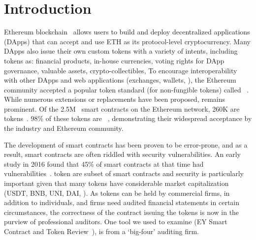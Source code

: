 
\section{Introduction}\label{sect:introduction}
Ethereum blockchain~\cite{EthGit,EIP150} allows users to build and deploy decentralized applications (DApps) that can accept and use ETH as its protocol-level cryptocurrency. Many DApps also issue their own custom tokens with a variety of intents, including tokens as: financial products, in-house currencies, voting rights for DApp governance, valuable assets, crypto-collectibles, \etc To encourage interoperability with other DApps and web applications (exchanges, wallets, \etc), the Ethereum community accepted a popular token standard (for non-fungible tokens) called \erc~\cite{ERC20Std}. While numerous \erc extensions or replacements have been proposed, \erc remains prominent. Of the 2.5M~\cite{Alethio} smart contracts on the Ethereum network, 260K are tokens~\cite{TokenTracker}. 98\% of these tokens are \erc~\cite{EtherScan}, demonstrating their widespread acceptance by the industry and Ethereum community.

The development of smart contracts has been proven to be error-prone, and as a result, smart contracts are often riddled with security vulnerabilities. An early study in 2016 found that 45\% of smart contracts at that time had vulnerabilities~\cite{MakSm}. \erc token are subset of smart contracts and security is particularly important given that many tokens have considerable market capitalization (\eg USDT, BNB, UNI, DAI, \etc). As tokens can be held by commercial firms, in addition to individuals, and firms need audited financial statements in certain circumstances, the correctness of the contract issuing the tokens is now in the purview of professional auditors. One tool we used to examine \sys (EY Smart Contract and Token Review~\cite{EYTool}), is from a `big-four' auditing firm.


